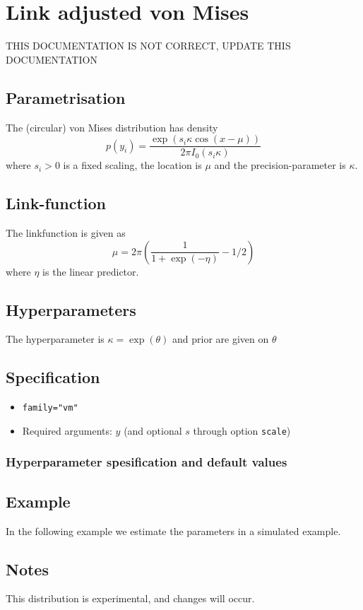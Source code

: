 \documentclass[a4paper,11pt]{article}
\begin{document}
\section*{Link adjusted von Mises}

{\Huge THIS DOCUMENTATION IS NOT CORRECT, UPDATE THIS DOCUMENTATION}


\subsection*{Parametrisation}

The (circular) von Mises distribution has density
\begin{displaymath}
    p(y_i) =\frac{\exp(s_i\kappa \cos(x-\mu ))}{2\pi I_{0}(s_i\kappa)}
\end{displaymath}
where $s_i>0$ is a fixed scaling, the location is $\mu$
and the precision-parameter is $\kappa$.

\subsection*{Link-function}

The linkfunction is given as 
\begin{displaymath}
    \mu =  2\pi \left(\frac{1}{1+\exp(-\eta)} - 1/2\right)
\end{displaymath}
where $\eta$  is the linear predictor.

\subsection*{Hyperparameters}

The hyperparameter is ${\kappa}=\exp(\theta)$
and prior are given on $\theta$
\subsection*{Specification}

\begin{itemize}
\item \texttt{family="vm"}
\item Required arguments: $y$ (and optional $s$ through option
    \texttt{scale})
\end{itemize}

\subsubsection*{Hyperparameter spesification and default values}


\subsection*{Example}

In the following example we estimate the parameters in a simulated
example.


\subsection*{Notes}

This distribution is experimental, and changes will occur.
\end{document}
